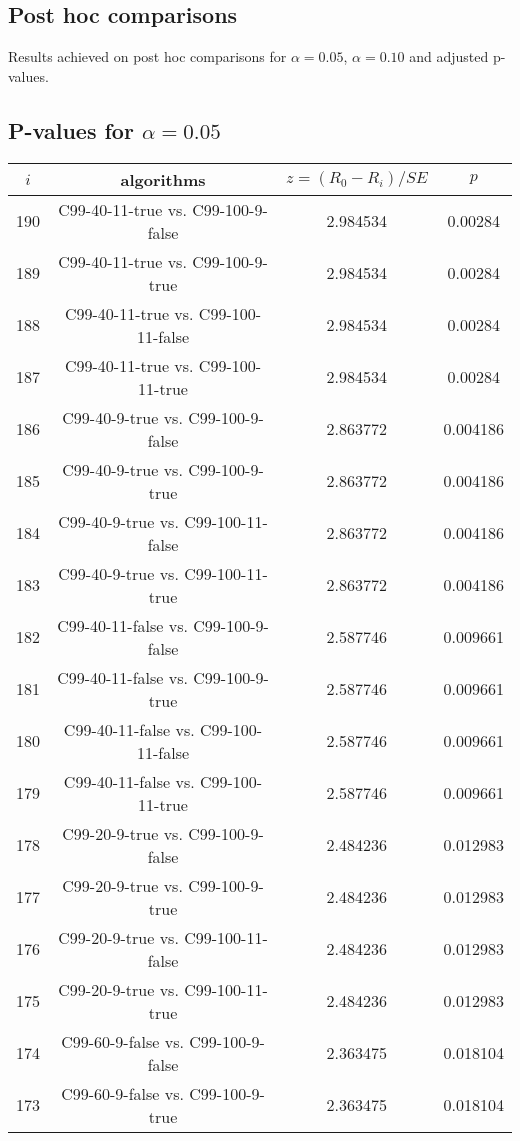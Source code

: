 \documentclass[a4paper,10pt]{article}
\begin{document}
\begin{landscape}
\pagebreak

\section{Post hoc comparisons}

Results achieved on post hoc comparisons for $\alpha = 0.05$, $\alpha = 0.10$ and adjusted p-values.

\subsection{P-values for $\alpha=0.05$}

\begin{table}[!htp]
\centering\scriptsize
\begin{tabular}{cccc}
$i$&algorithms&$z=(R_0 - R_i)/SE$&$p$\\
\hline190&C99-40-11-true vs. C99-100-9-false&2.984534&0.00284\\
189&C99-40-11-true vs. C99-100-9-true&2.984534&0.00284\\
188&C99-40-11-true vs. C99-100-11-false&2.984534&0.00284\\
187&C99-40-11-true vs. C99-100-11-true&2.984534&0.00284\\
186&C99-40-9-true vs. C99-100-9-false&2.863772&0.004186\\
185&C99-40-9-true vs. C99-100-9-true&2.863772&0.004186\\
184&C99-40-9-true vs. C99-100-11-false&2.863772&0.004186\\
183&C99-40-9-true vs. C99-100-11-true&2.863772&0.004186\\
182&C99-40-11-false vs. C99-100-9-false&2.587746&0.009661\\
181&C99-40-11-false vs. C99-100-9-true&2.587746&0.009661\\
180&C99-40-11-false vs. C99-100-11-false&2.587746&0.009661\\
179&C99-40-11-false vs. C99-100-11-true&2.587746&0.009661\\
178&C99-20-9-true vs. C99-100-9-false&2.484236&0.012983\\
177&C99-20-9-true vs. C99-100-9-true&2.484236&0.012983\\
176&C99-20-9-true vs. C99-100-11-false&2.484236&0.012983\\
175&C99-20-9-true vs. C99-100-11-true&2.484236&0.012983\\
174&C99-60-9-false vs. C99-100-9-false&2.363475&0.018104\\
173&C99-60-9-false vs. C99-100-9-true&2.363475&0.018104\\

\end{tabular}
\end{table}
\end{landscape}
\end{document}
